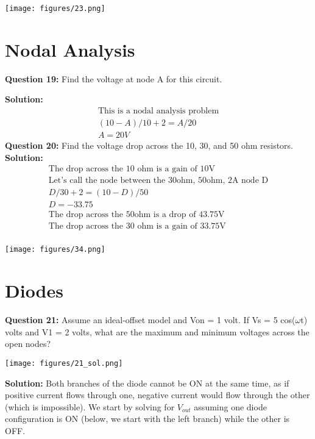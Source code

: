 \documentclass{article}
\begin{document}
\begin{center}
    \texttt{[image: figures/23.png]}

\end{center}

\section*{Nodal Analysis}
\textbf{Question 19:} Find the voltage at node A for this circuit.

\textbf{Solution:}
\begin{align*}
    \text{This is a nodal analysis problem}\\
  ( 10 - A)/10 + 2 = A/20\\
  A = \boxed{20 V}
\end{align*}
\textbf{Question 20:} Find the voltage drop across the 10, 30, and 50 ohm resistors.
\textbf{Solution:}
\begin{align*}
    \text{The drop across the 10 ohm is a gain of 10V}\\
    \text{Let's call the node between the 30ohm, 50ohm, 2A node D}\\
    D/30 + 2 = (10 - D)/50\\
    D =  -33.75\\
    \text{The drop across the 50ohm is a drop of 43.75V}\\
    \text{The drop across the 30 ohm is a gain of 33.75V}\\
\end{align*}

\begin{center}
    \texttt{[image: figures/34.png]}
\end{center}

\pagebreak

\section*{Diodes}
\textbf{Question 21:} Assume an ideal-offset model and Von = 1 volt. If Vs = 5 cos(\(\omega\)t) volts and V1 = 2 volts, what are the maximum and minimum voltages across the open nodes?

\begin{center}

        \texttt{[image: figures/21\_sol.png]}
\end{center}

\textbf{Solution:} 
Both branches of the diode cannot be ON at the same time, as if positive current flows through one, negative current would flow through the other (which is impossible). We start by solving for $V_{out}$ assuming one diode configuration is ON (below, we start with the left branch) while the other is OFF.
\end{document}
